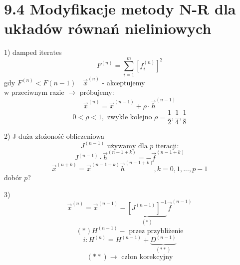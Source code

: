 \section{9.4 Modyfikacje metody N-R dla układów równań nieliniowych}

\begin{frame}{}
  \begin{block}{1) damped iterates}
    $$F^{(n)}=\sum_{i=1}^{m} [f_i^{(n)}]^2$$
    gdy $F^{(n)}<F{(n-1)}\quad\overrightarrow{x}^{(n)}$ - akceptujemy\\
    w przeciwnym razie $\rightarrow$ próbujemy:
    $$\overrightarrow{x}^{(n)}=\overrightarrow{x}^{(n-1)}+\rho \cdot \overrightarrow{h}^{(n-1)}$$
    $$0<\rho<1,\text{ zwykle kolejno } \rho=\frac{1}{2},\frac{1}{4},\frac{1}{8}$$
  \end{block}
\end{frame}

\begin{frame}{}
  \begin{block}{2)}
    J-duża złożoność obliczeniowa
    $$J^{(n-1)}\text{ używamy dla }p\text{ iteracji:}$$
    $$J^{(n-1)} \cdot \overrightarrow{h}^{(n-1+k)}=-\overrightarrow{f}^{(n-1+k)}$$
    $$\overrightarrow{x}^{(n+k)}=\overrightarrow{x}^{(n-1+k)}\overrightarrow{h}^{(n-1+k)}, k=0,1,...,p-1$$
    dobór $p$?
  \end{block}
\end{frame}

\begin{frame}{}
  \begin{block}{3)}
    $$\overrightarrow{x}^{(n)}=\overrightarrow{x}^{(n-1)}-\underbrace{[J^{(n-1)}]^{-1}}_{(*)}\overrightarrow{f}^{(n-1)}$$
    $$(*)H^{(n-1)}-\text{ przez przybliżenie}$$
    $${i:H^{(n)}=H^{(n-1)}+\underbrace{D^{(n-1)}}_{(**)}}$$
    $$(**)\rightarrow\text{ człon korekcyjny}$$
  \end{block}
\end{frame}